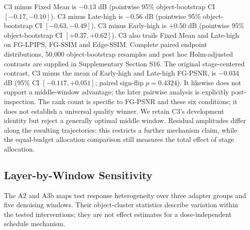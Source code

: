 \documentclass[times,twocolumn,final]{elsarticle}
\providecommand{\DIFadd}[1]{{\protect\color{blue} \sf #1}} %
\providecommand{\DIFaddbegin}{} %
\providecommand{\DIFaddend}{} %
\begin{document}
  \DIFaddbegin \DIFadd{C3 minus Fixed Mean is $-0.13$ dB (pointwise 95\% object-bootstrap CI $[-0.17,-0.10]$). C3 minus Late-high is $-0.56$ dB (pointwise 95\% object-bootstrap CI $[-0.63,-0.49]$). C3 minus Early-high is $+0.50$ dB (pointwise 95\% object-bootstrap CI $[+0.37,+0.62]$). C3 also trails Fixed Mean and Late-high on FG-LPIPS, FG-SSIM and Edge-SSIM. Complete paired endpoint distributions, 50,000 object-bootstrap resamples and post hoc Holm-adjusted contrasts are supplied in Supplementary Section S16. The original stage-centered contrast, C3 minus the mean of Early-high }\DIFaddend and   \DIFaddbegin \DIFadd{Late-high FG-PSNR, is $-0.034$ dB (95\% CI $[-0.117,+0.051]$; paired sign-flip $p=0.4324$). It likewise does not support a middle-window advantage; the later pairwise analysis is explicitly post-inspection. The rank count is specific to FG-PSNR and these six conditions; it does not establish a universal quality winner. We retain C3's development identity but reject a generally optimal middle window. Residual amplitudes differ along the resulting trajectories: this restricts a further mechanism claim, while the equal-budget allocation comparison still measures the total effect of stage allocation.
}

\subsection{Layer-by-Window Sensitivity}
\label{subsec:layerwindow}

\DIFadd{The A2 and A3b maps test response heterogeneity over three adapter groups and five denoising windows. Their object-cluster statistics describe variation within the tested interventions; they are not effect estimates for a dose-independent schedule mechanism}\DIFaddend .
\end{document}
